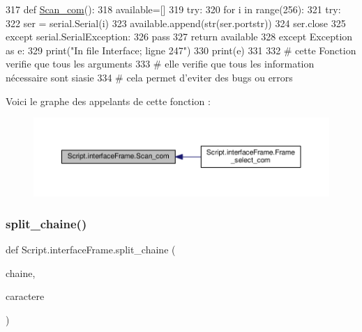 \begin{DoxyCode}
317 \textcolor{keyword}{def }\hyperlink{namespaceScript_1_1interfaceFrame_a76119121c3aceb43846ba3ea526623ad}{Scan\_com}():
318     available=[]
319     \textcolor{keywordflow}{try}:
320         \textcolor{keywordflow}{for} i \textcolor{keywordflow}{in} range(256):
321             \textcolor{keywordflow}{try}:
322                 ser = serial.Serial(i)
323                 available.append(str(ser.portstr))
324                 ser.close
325             \textcolor{keywordflow}{except} serial.SerialException:
326                 \textcolor{keywordflow}{pass}
327         \textcolor{keywordflow}{return} available
328     \textcolor{keywordflow}{except} Exception \textcolor{keyword}{as} e:
329         print(\textcolor{stringliteral}{"In file Interface; ligne 247"})
330         print(e)
331 
332 \textcolor{comment}{# cette Fonction verifie que tous les arguments
}
333 \textcolor{comment}{# elle verifie que tous les information nécessaire sont siasie 
}
334 \textcolor{comment}{# cela permet d'eviter des bugs ou errors
}
\end{DoxyCode}
Voici le graphe des appelants de cette fonction \+:\nopagebreak
\begin{figure}[H]
\begin{center}
\leavevmode
\includegraphics[width=350pt]{namespaceScript_1_1interfaceFrame_a76119121c3aceb43846ba3ea526623ad_icgraph}
\end{center}
\end{figure}
\mbox{\label{namespaceScript_1_1interfaceFrame_ab554e77db5080fb2eae78e39ebbeb395}} 
\subsubsection{\texorpdfstring{split\+\_\+chaine()}{split\_chaine()}}
{\footnotesize\ttfamily def Script.\+interface\+Frame.\+split\+\_\+chaine (\begin{DoxyParamCaption}\item[{}]{chaine,  }\item[{}]{caractere }\end{DoxyParamCaption})}



